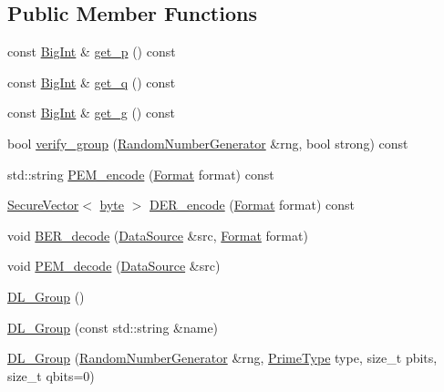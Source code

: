 \subsection*{Public Member Functions}
\begin{DoxyCompactItemize}
\item 
const \hyperlink{classBotan_1_1BigInt}{Big\-Int} \& \hyperlink{classBotan_1_1DL__Group_ae0c2c51867c8873d1d979293f424da28}{get\-\_\-p} () const 
\item 
const \hyperlink{classBotan_1_1BigInt}{Big\-Int} \& \hyperlink{classBotan_1_1DL__Group_a6211cd57c996831bb6752391059b0e74}{get\-\_\-q} () const 
\item 
const \hyperlink{classBotan_1_1BigInt}{Big\-Int} \& \hyperlink{classBotan_1_1DL__Group_a0477a9166f3456d940603d46e50ff895}{get\-\_\-g} () const 
\item 
bool \hyperlink{classBotan_1_1DL__Group_a9dda7a6b0bb0b79a5ab83c85cace4d93}{verify\-\_\-group} (\hyperlink{classBotan_1_1RandomNumberGenerator}{Random\-Number\-Generator} \&rng, bool strong) const 
\item 
std\-::string \hyperlink{classBotan_1_1DL__Group_ade2f4219d5e38f89b63dd3a1798b0a6d}{P\-E\-M\-\_\-encode} (\hyperlink{classBotan_1_1DL__Group_ac602a30420ceec03fa181a10b09312a7}{Format} format) const 
\item 
\hyperlink{classBotan_1_1SecureVector}{Secure\-Vector}$<$ \hyperlink{namespaceBotan_a7d793989d801281df48c6b19616b8b84}{byte} $>$ \hyperlink{classBotan_1_1DL__Group_aa30fa2f52b1c7c7c1a035a8cb7b59eb4}{D\-E\-R\-\_\-encode} (\hyperlink{classBotan_1_1DL__Group_ac602a30420ceec03fa181a10b09312a7}{Format} format) const 
\item 
void \hyperlink{classBotan_1_1DL__Group_a2b22b107213b2ce5910cdd70200f18c7}{B\-E\-R\-\_\-decode} (\hyperlink{classBotan_1_1DataSource}{Data\-Source} \&src, \hyperlink{classBotan_1_1DL__Group_ac602a30420ceec03fa181a10b09312a7}{Format} format)
\item 
void \hyperlink{classBotan_1_1DL__Group_a06cf021f2b2ca8f9b60810a27f98b10d}{P\-E\-M\-\_\-decode} (\hyperlink{classBotan_1_1DataSource}{Data\-Source} \&src)
\item 
\hyperlink{classBotan_1_1DL__Group_a9415e44dbc157122fae00f4f0e35f0a5}{D\-L\-\_\-\-Group} ()
\item 
\hyperlink{classBotan_1_1DL__Group_a4dffbef8a72949eb2ccfd36752cd10db}{D\-L\-\_\-\-Group} (const std\-::string \&name)
\item 
\hyperlink{classBotan_1_1DL__Group_a87e245d95761ee55d634de3b6cec0f5e}{D\-L\-\_\-\-Group} (\hyperlink{classBotan_1_1RandomNumberGenerator}{Random\-Number\-Generator} \&rng, \hyperlink{classBotan_1_1DL__Group_ab5b6922453bcee11d6a4b3ebcf36f54b}{Prime\-Type} type, size\-\_\-t pbits, size\-\_\-t qbits=0)

\end{DoxyCompactItemize}
